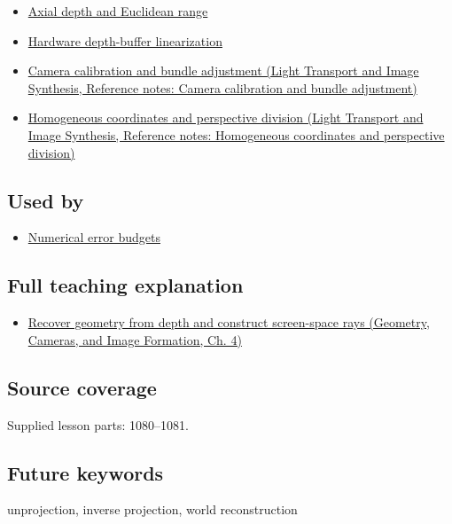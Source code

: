 \begin{itemize}
\tightlist
\item
  \hyperref[appendix-cac01ebeeb11]{Axial depth and Euclidean range}
\item
  \hyperref[appendix-1bc40b08db4a]{Hardware depth-buffer linearization}
\item
  \href{../04-Light-Transport-and-Image-Synthesis/main.pdf\#nameddest=appendix-3ee9861904d5}{Camera calibration and bundle adjustment (Light Transport and Image Synthesis, Reference notes: Camera calibration and bundle adjustment)}
\item
  \href{../04-Light-Transport-and-Image-Synthesis/main.pdf\#nameddest=appendix-cb3b26862282}{Homogeneous coordinates and perspective division (Light Transport and Image Synthesis, Reference notes: Homogeneous coordinates and perspective division)}
\end{itemize}

\subsection{Used by}\label{appendix-2cbf2968e866-used-by}

\hypertarget{appendix-2cbf2968e866-used-by}{}

\begin{itemize}
\tightlist
\item
  \hyperref[appendix-31b8c295e05f]{Numerical error budgets}
\end{itemize}

\subsection{Full teaching explanation}\label{appendix-2cbf2968e866-full-teaching-explanation}

\hypertarget{appendix-2cbf2968e866-full-teaching-explanation}{}

\begin{itemize}
\tightlist
\item
  \href{../03-Geometry-Cameras-and-Image-Formation/main.pdf\#nameddest=02-foundations-ii-ch035-recover-geometry-from-depth-and-construct-screen-space-rays}{Recover geometry from depth and construct screen-space rays (Geometry, Cameras, and Image Formation, Ch. 4)}
\end{itemize}

\subsection{Source coverage}\label{appendix-2cbf2968e866-source-coverage}

\hypertarget{appendix-2cbf2968e866-source-coverage}{}

Supplied lesson parts: 1080--1081.

\subsection{Future keywords}\label{appendix-2cbf2968e866-future-keywords}

\hypertarget{appendix-2cbf2968e866-future-keywords}{}

unprojection, inverse projection, world reconstruction
